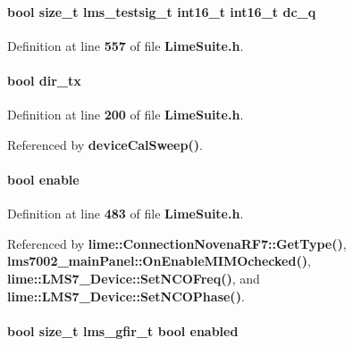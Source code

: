 \paragraph[{dc\+\_\+q}]{\setlength{\rightskip}{0pt plus 5cm}bool size\+\_\+t {\bf lms\+\_\+testsig\+\_\+t} int16\+\_\+t int16\+\_\+t dc\+\_\+q}\label{group__FN__HIGH__LVL_gad41ae41bcc2ea56cf92e419bd439c175}


Definition at line {\bf 557} of file {\bf Lime\+Suite.\+h}.

\paragraph[{dir\+\_\+tx}]{\setlength{\rightskip}{0pt plus 5cm}bool dir\+\_\+tx}\label{group__FN__HIGH__LVL_ga4310b6cbe0d1f02c0d8bacadf8fa09a2}


Definition at line {\bf 200} of file {\bf Lime\+Suite.\+h}.



Referenced by {\bf device\+Cal\+Sweep()}.

\paragraph[{enable}]{\setlength{\rightskip}{0pt plus 5cm}bool enable}\label{group__FN__HIGH__LVL_gac842b6c1dcb3b1f11b611620199dc55c}


Definition at line {\bf 483} of file {\bf Lime\+Suite.\+h}.



Referenced by {\bf lime\+::\+Connection\+Novena\+R\+F7\+::\+Get\+Type()}, {\bf lms7002\+\_\+main\+Panel\+::\+On\+Enable\+M\+I\+M\+Ochecked()}, {\bf lime\+::\+L\+M\+S7\+\_\+\+Device\+::\+Set\+N\+C\+O\+Freq()}, and {\bf lime\+::\+L\+M\+S7\+\_\+\+Device\+::\+Set\+N\+C\+O\+Phase()}.

\paragraph[{enabled}]{\setlength{\rightskip}{0pt plus 5cm}bool size\+\_\+t {\bf lms\+\_\+gfir\+\_\+t} bool enabled}\label{group__FN__HIGH__LVL_ga1e1d534b839ac81817fcbab4f8d5c070}


